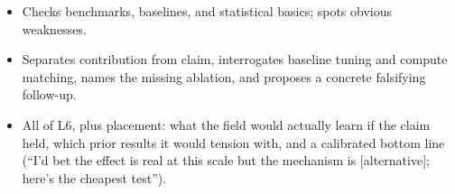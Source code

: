 \begin{interviewq}

\goodgreat
\begin{itemize}
    \item {} Checks benchmarks, baselines, and statistical basics; spots obvious weaknesses.
    \item {} Separates contribution from claim, interrogates baseline tuning and compute matching, names the missing ablation, and proposes a concrete falsifying follow-up.
    \item {} All of L6, plus placement: what the field would actually learn if the claim held, which prior results it would tension with, and a calibrated bottom line (``I'd bet the effect is real at this scale but the mechanism is [alternative]; here's the cheapest test'').
\end{itemize}

\end{interviewq}


